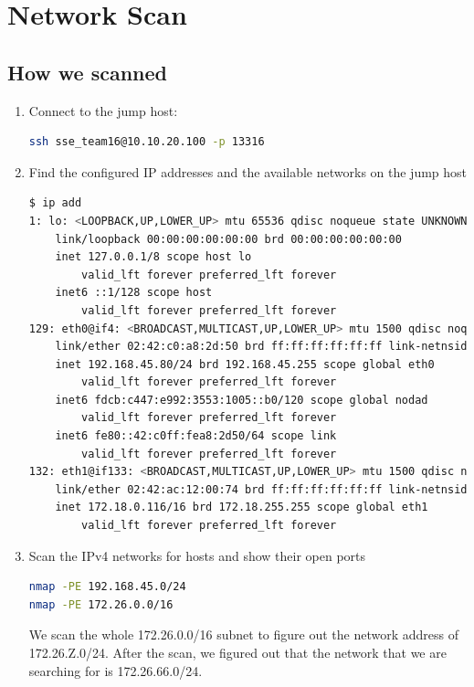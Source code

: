\section{Network Scan}

\subsection{How we scanned}
\begin{enumerate}
    \item Connect to the jump host:
    \begin{lstlisting}[language=bash,numbers=none]
ssh sse_team16@10.10.20.100 -p 13316
    \end{lstlisting}

    \item Find the configured IP addresses and the available networks on the jump host
    \begin{lstlisting}[language=bash,numbers=none]
$ ip add
1: lo: <LOOPBACK,UP,LOWER_UP> mtu 65536 qdisc noqueue state UNKNOWN group default qlen 1000
    link/loopback 00:00:00:00:00:00 brd 00:00:00:00:00:00
    inet 127.0.0.1/8 scope host lo
        valid_lft forever preferred_lft forever
    inet6 ::1/128 scope host
        valid_lft forever preferred_lft forever
129: eth0@if4: <BROADCAST,MULTICAST,UP,LOWER_UP> mtu 1500 qdisc noqueue state UP group default
    link/ether 02:42:c0:a8:2d:50 brd ff:ff:ff:ff:ff:ff link-netnsid 0
    inet 192.168.45.80/24 brd 192.168.45.255 scope global eth0
        valid_lft forever preferred_lft forever
    inet6 fdcb:c447:e992:3553:1005::b0/120 scope global nodad
        valid_lft forever preferred_lft forever
    inet6 fe80::42:c0ff:fea8:2d50/64 scope link
        valid_lft forever preferred_lft forever
132: eth1@if133: <BROADCAST,MULTICAST,UP,LOWER_UP> mtu 1500 qdisc noqueue state UP group default
    link/ether 02:42:ac:12:00:74 brd ff:ff:ff:ff:ff:ff link-netnsid 0
    inet 172.18.0.116/16 brd 172.18.255.255 scope global eth1
        valid_lft forever preferred_lft forever
    \end{lstlisting}

    \item Scan the IPv4 networks for hosts and show their open ports
    \begin{lstlisting}[language=bash,numbers=none]
nmap -PE 192.168.45.0/24
nmap -PE 172.26.0.0/16
    \end{lstlisting}
    We scan the whole 172.26.0.0/16 subnet to figure out the network address of 172.26.Z.0/24.
    After the scan, we figured out that the network that we are searching for is 172.26.66.0/24.


\end{enumerate}
